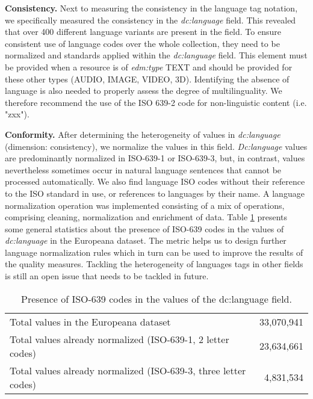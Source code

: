 \noindent\textbf{Consistency.}
Next to measuring the consistency in the language tag notation, we specifically measured the consistency in the \textit{dc:language} field. This revealed that over 400 different language variants are present in the field. 
To ensure consistent use of language codes over the whole collection, they need to be normalized and standards applied within the \textit{dc:language} field. This element must be provided when a resource is of \textit{edm:type} TEXT and should be provided for these other types (AUDIO, IMAGE, VIDEO, 3D). Identifying the absence of language is also needed to properly assess the degree of multilinguality. We therefore recommend the use of the ISO 639-2 code for non-linguistic content (i.e. "zxx").

\noindent\textbf{Conformity.}
After determining the heterogeneity of values in \textit{dc:language} (dimension: consistency), we normalize the values in this field. \textit{Dc:language} values are predominantly normalized in ISO-639-1 or ISO-639-3, but, in contrast, values nevertheless sometimes occur in natural language sentences that cannot be processed automatically. We also find language ISO codes without their reference to the ISO standard in use, or references to languages by their name.
A language normalization operation was implemented consisting of a mix of operations, comprising cleaning, normalization and enrichment of data. 
Table \ref{table:iso} presents some general statistics about the presence of ISO-639 codes in the values of \textit{dc:language} in the Europeana dataset.
The metric helps us to design further language normalization rules which in turn can be used to improve the results of the quality measures. 
Tackling the heterogeneity of languages tags in other fields is still an open issue that needs to be tackled in future. 

\begin{table}[tb]
\caption{Presence of ISO-639 codes in the values of the dc:language field.}
\centering
\begin{tabular}{ l r }
\hline\noalign{\smallskip}
Total values in the Europeana dataset & 33,070,941 \\
Total values already normalized
(ISO-639-1, 2 letter codes)           & 23,634,661 \\
Total values already normalized
 (ISO-639-3, three letter codes)      &  4,831,534 \\ \hline
\end{tabular}
\label{table:iso}
\end{table}


